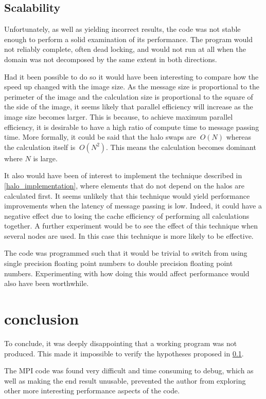\documentclass[a4paper,12pt]{article}
\begin{document}
\subsection{Scalability}
\label{scalability}
Unfortunately, as well as yielding incorrect results, the code was not stable enough to perform a solid examination of its performance. The program would not reliably complete, often dead locking, and would not run at all when the domain was not decomposed by the same extent in both directions.

Had it been possible to do so it would have been interesting to compare how the speed up changed with the image size. As the message size is proportional to the perimeter of the image and the calculation size is proportional to the square of the side of the image, it seems likely that parallel efficiency will increase as the image size becomes larger. This is because, to achieve maximum parallel efficiency, it is desirable to have a high ratio of compute time to message passing time. More formally, it could be said that the halo swaps are $~O(N)$ whereas the calculation itself is $~O(N^2)$. This means the calculation becomes dominant where $N$ is large.

It also would have been of interest to implement the technique described in \ref{halo_implementation}, where elements that do not depend on the halos are calculated first. It seems unlikely that this technique would yield performance improvements when the latency of message passing is low. Indeed, it could have a negative effect due to losing the cache efficiency of performing all calculations together. A further experiment would be to see the effect of this technique when several nodes are used. In this case this technique is more likely to be effective.

The code was programmed such that it would be trivial to switch from using single precision floating point numbers to double precision floating point numbers. Experimenting with how doing this would affect performance would also have been worthwhile.

\section{conclusion}
To conclude, it was deeply disappointing that a working program was not produced. This made it impossible to verify the hypotheses proposed in \ref{scalability}.

The MPI code was found very difficult and time consuming to debug, which as well as making the end result unusable, prevented the author from exploring other more interesting performance aspects of the code.
\end{document}
